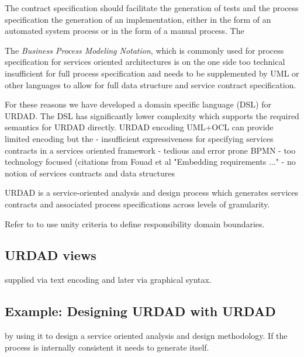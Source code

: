 The contract specification should facilitate the generation of tests and the process specification the generation of an implementation, either in the form of an automated system process or in the form of a manual process. The


The \emph{Business Process Modeling Notation}, which is commonly used for process specification for services oriented architectures is on the one side too technical \cite{} insufficient for full process specification and needs to be supplemented by UML or other languages to allow for full data structure and service contract specification.


For these reasons we have developed a domain specific language (DSL) for URDAD. The DSL has significantly lower complexity which supports the required semantics for URDAD directly. 
URDAD encoding
UML+OCL can provide limited encoding but the
  - insufficient expressiveness for specifying services contracts in a services oriented framework
  - tedious and error prone
BPMN
  - too technology focused (citations from Fouad et al "Embedding requirements ..."
  - no notion of services contracts and data structures  

URDAD is a service-oriented analysis and design process which generates services contracts and associated process specifications across levels of granularity. 

Refer to \cite{gonzalez_unity_2009} to use unity criteria to define responsibility domain boundaries.


\subsection{URDAD views}
\label{sec:urdadViews}

supplied via text encoding and later via graphical syntax.


\subsection{Example: Designing URDAD with URDAD}
\label{sec:urdadExample}
by using it to design a service oriented analysis and design methodology. If the process is internally consistent it needs to generate itself. 




